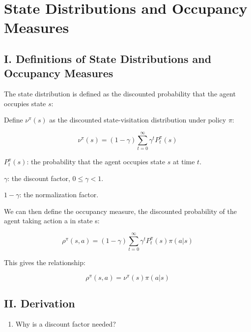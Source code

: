 \setcounter{section}{2}

\hypertarget{state-distributions-and-occupancy-measures}{%
\section{State Distributions and Occupancy Measures}\label{state-distributions-and-occupancy-measures}}

\hypertarget{i.-definitions-of-state-distributions-and-occupancy-measures}{%
\subsection{I. Definitions of State Distributions and Occupancy Measures}\label{i.-definitions-of-state-distributions-and-occupancy-measures}}

The state distribution is defined as the discounted probability that the agent occupies state \(s\):

Define \(\nu^\pi(s)\) as the discounted state-visitation distribution under policy \(\pi\):

\[
\nu^\pi(s) = (1-\gamma)\sum_{t=0}^{\infty}\gamma^t P_t^\pi(s)
\]

\(P_t^\pi(s)\): the probability that the agent occupies state \(s\) at time \(t\).

\(\gamma\): the discount factor, \(0 \le \gamma < 1\).

\(1-\gamma\): the normalization factor.

We can then define the occupancy measure, the discounted probability of the agent taking action a in state s:

\[
\rho^\pi(s,a) = (1-\gamma)\sum_{t=0}^{\infty}\gamma^t P_t^\pi(s)\pi(a|s)
\]

This gives the relationship:

\[
\rho^\pi(s,a) = \nu^\pi(s)\pi(a|s)
\]

\hypertarget{ii.-derivation}{%
\subsection{II. Derivation}\label{ii.-derivation}}

\begin{enumerate}
\def\labelenumi{\arabic{enumi}.}
\tightlist
\item
  Why is a discount factor needed?
\end{enumerate}

